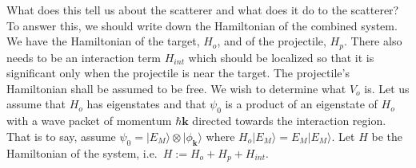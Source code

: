 \documentclass[11pt]{article}
\theoremstyle{remark}
\begin{document}
What does this tell us about the scatterer and what does it do to the
scatterer? To answer this, we should write down the Hamiltonian of the
combined system. We have the Hamiltonian of the target, $H_o$, and of
the projectile, $H_p$. There also needs to be an interaction term
$H_{int}$ which should be localized so that it is significant 
only when the projectile is
near the target. The projectile's
Hamiltonian shall be assumed to be free. We wish to determine what
$V_o$ is. Let us assume that $H_o$ has eigenstates and that $\psi_0$
is a product of an eigenstate of $H_o$ with a wave packet of momentum
$\hbar \ensuremath{\boldsymbol{k}}$ directed towards the interaction region. That is to say, assume
 $\psi_0 = \lvert E_M \rangle \otimes \lvert \phi_{\ensuremath{\boldsymbol{k}}} \rangle$
 where $H_o \lvert E_M \rangle = E_M
\lvert E_M \rangle$. Let $H$ be the Hamiltonian of the system, i.e.\ 
$ H\ensuremath{:=} H_o +H_p +H_{int}$.
\end{document}

